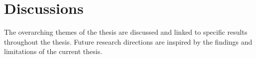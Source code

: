 \section*{Discussions}
The overarching themes of the thesis are discussed and linked to specific results throughout the thesis. Future research directions are inspired by the findings and limitations of the current thesis.

